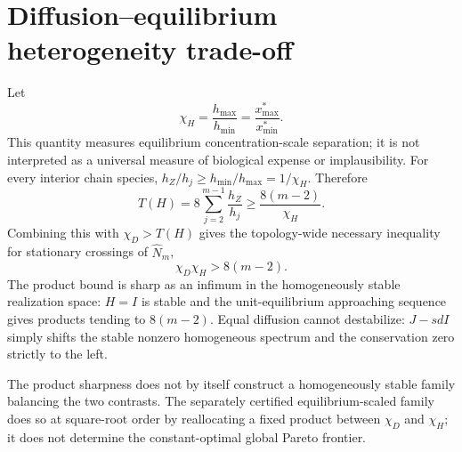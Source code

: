 \section*{Diffusion--equilibrium heterogeneity trade-off}
Let
\[
\chi_H=\frac{h_{\max}}{h_{\min}}
=\frac{x^*_{\max}}{x^*_{\min}}.
\]
This quantity measures equilibrium concentration-scale separation; it is not
interpreted as a universal measure of biological expense or implausibility.
For every interior chain species,
$h_Z/h_j\ge h_{\min}/h_{\max}=1/\chi_H$.  Therefore
\[
T(H)=8\sum_{j=2}^{m-1}\frac{h_Z}{h_j}
\ge\frac{8(m-2)}{\chi_H}.
\]
Combining this with $\chi_D>T(H)$ gives the topology-wide necessary inequality
for stationary crossings of $\widehat N_m$,
\[
\boxed{\chi_D\chi_H>8(m-2).}
\]
The product bound is sharp as an infimum in the homogeneously stable
realization space: $H=I$ is stable and the unit-equilibrium approaching
sequence gives products tending to $8(m-2)$.  Equal diffusion cannot
destabilize: $J-sdI$ simply shifts the stable nonzero homogeneous spectrum and
the conservation zero strictly to the left.

The product sharpness does not by itself construct a homogeneously stable
family balancing the two contrasts.  The separately certified
equilibrium-scaled family does so at square-root order by reallocating a fixed
product between $\chi_D$ and $\chi_H$; it does not determine the
constant-optimal global Pareto frontier.
